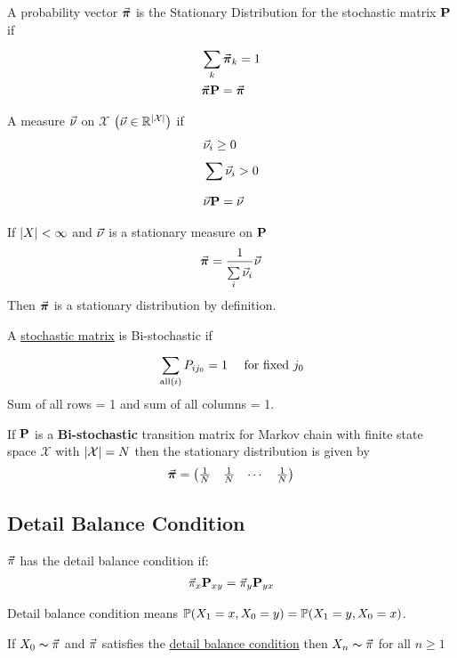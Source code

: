 \documentclass[12pt,a4paper]{article}
\begin{document}
\begin{defn}
A probability vector $\va*{\pi}$ is the Stationary Distribution for the stochastic matrix $\vb{P}$ if 
\begin{align*}
&\nsum{k}{}\va*\pi_k = 1\\
&\va*{\pi}\vb{P} = \va*{\pi}
\end{align*}
\end{defn}
\begin{defn}
A measure $\va\nu$ on $\mathcal{X}$ $\left(\va\nu \in \R^{\abs{\mathcal{X}}}\right)$ if 
\begin{align*}
&\va \nu_i \geq 0\\
&\nsum{}{}\va\nu_i > 0\\
&\va\nu \vb{P} = \va\nu
\end{align*}
\end{defn}
\begin{prop}
\label{statdm}
If $\abs{X} < \infty$ and $\va\nu$ is a stationary measure on $\vb P$  
\begin{align*}
\va*\pi = \frac{1}{\nsum{i}{}\va\nu_i}\va\nu
\end{align*}
Then $\va*\pi$ is a stationary distribution by definition.
\end{prop}
\begin{defn}
A \hyperref[stocmat]{stochastic matrix} is Bi-stochastic if 
\begin{align*}
&\nsum{\all(i)}{}P_{ij_0} = 1 & \text{ for fixed $j_0$}
\end{align*}
Sum of all rows = 1 and sum of all columns = 1.   
\end{defn}

\begin{prop}
If $\vb P$ is a \textbf{Bi-stochastic} transition matrix for Markov chain with finite state space $\mathcal{X}$ with $\abs{\mathcal{X}} = N$ then the stationary distribution is given by 
\begin{align*}
\va*\pi = \mqty(\frac{1}{N} & \frac{1}{N} & \cdots & \frac{1}{N})
\end{align*}
\end{prop}
\newpage
\subsection{Detail Balance Condition}
\begin{defn}
\label{detailb}
$\va\pi$ has the detail balance condition if:  
\begin{align*}
\va\pi_x \vb{P}_{xy} = \va \pi_y \vb{P}_{yx}
\end{align*}
\end{defn}
\begin{note}
Detail balance condition means $\P(X_1 = x, X_0 = y) = \P(X_1 = y , X_0 = x)$. 
\end{note}
\begin{thm}
If $X_0 \sim \va\pi$ and $\va\pi$ satisfies the \hyperref[detailb]{detail balance condition} then $X_n \sim \va \pi$ for all $n\geq 1$
\end{thm}
\newpage
\end{document}
